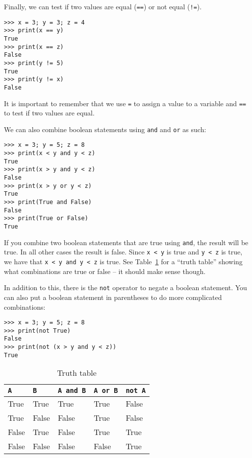 \documentclass[11pt,hidelinks]{article}
\begin{document}
Finally, we can test if two values are equal
(\lstinline{==}) or not equal (\lstinline{!=}).
\begin{lstlisting}[style=ipython]
>>> x = 3; y = 3; z = 4
>>> print(x == y)
True
>>> print(x == z)
False
>>> print(y != 5)
True
>>> print(y != x)
False
\end{lstlisting}

It is important to remember that we use \lstinline{=} to assign a value to a variable and \lstinline{==} to test if two values are equal.

We can also combine boolean statements using \lstinline!and! and \lstinline!or!
as such:
\begin{lstlisting}[style=ipython]
>>> x = 3; y = 5; z = 8
>>> print(x < y and y < z)
True
>>> print(x > y and y < z)
False
>>> print(x > y or y < z)
True
>>> print(True and False)
False
>>> print(True or False)
True
\end{lstlisting}
If you combine two boolean statements that are true using \lstinline!and!, the
result will be true. In all other cases the result is false. Since 
\lstinline!x < y! is true and \lstinline!y < z! is true, we have that 
\lstinline!x < y and y < z! is true. See Table~\ref{tab:truth} for a ``truth
table'' showing what combinations are true or false -- it should make sense
though.

In addition to this, there is the \lstinline!not! operator to negate a boolean
statement. You can also put a boolean statement in parentheses to do more
complicated combinations:
\begin{lstlisting}[style=ipython]
>>> x = 3; y = 5; z = 8
>>> print(not True)
False
>>> print(not (x > y and y < z))
True
\end{lstlisting}

\begin{table}[!ht]
  \centering
  \begin{tabular}{ll | lll}
    \toprule
    \lstinline!A! & \lstinline!B! & \lstinline!A and B! & \lstinline!A or B! & \lstinline!not A! \\
    \midrule
    True & True & True & True & False\\
    True & False & False & True & False\\
    False & True & False & True & True\\
    False & False & False & False & True \\
    \bottomrule
  \end{tabular}
  \caption{Truth table}
  \label{tab:truth}
\end{table}
\end{document}

